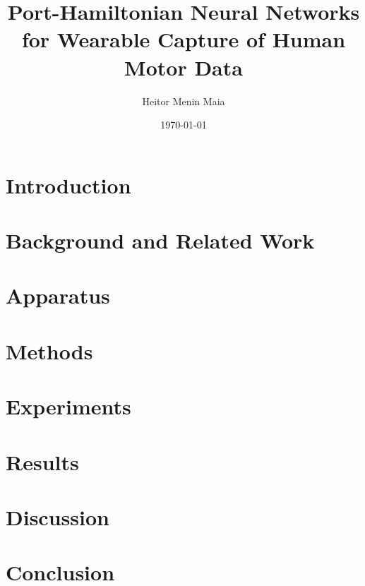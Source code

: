 \documentclass[11pt]{article}
\title{Port-Hamiltonian Neural Networks for Wearable Capture of Human Motor Data}
\author{Heitor Menin Maia}
\date{\today}
\begin{document}
\maketitle

\begin{abstract}
\end{abstract}

\section{Introduction}\label{sec:intro}

\section{Background and Related Work}\label{sec:background}

\section{Apparatus}\label{sec:apparatus}

\section{Methods}\label{sec:methods}

\section{Experiments}\label{sec:experiments}

\section{Results}\label{sec:results}

\section{Discussion}\label{sec:discussion}

\section{Conclusion}\label{sec:conclusion}



\end{document}

